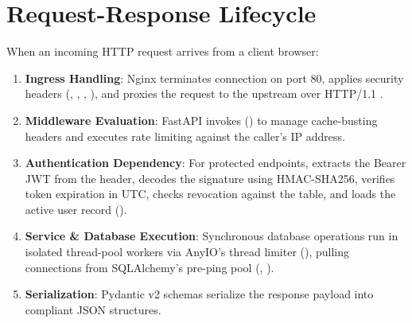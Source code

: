 \section{Request-Response Lifecycle}
When an incoming HTTP request arrives from a client browser:
\begin{enumerate}[leftmargin=6mm,itemsep=1.5mm]
    \item \textbf{Ingress Handling}: Nginx terminates connection on port 80, applies security headers (, , , ), and proxies the request to the upstream  over HTTP/1.1 \cite{ref:nginx_conf}.
    \item \textbf{Middleware Evaluation}: FastAPI invokes  () to manage cache-busting headers and executes  rate limiting against the caller's IP address.
    \item \textbf{Authentication Dependency}: For protected endpoints,  extracts the Bearer JWT from the  header, decodes the signature using HMAC-SHA256, verifies token expiration in UTC, checks revocation against the  table, and loads the active user record ().
    \item \textbf{Service \& Database Execution}: Synchronous database operations run in isolated thread-pool workers via AnyIO's thread limiter (), pulling connections from SQLAlchemy's pre-ping pool (, ).
    \item \textbf{Serialization}: Pydantic v2 schemas serialize the response payload into compliant JSON structures.
\end{enumerate}

